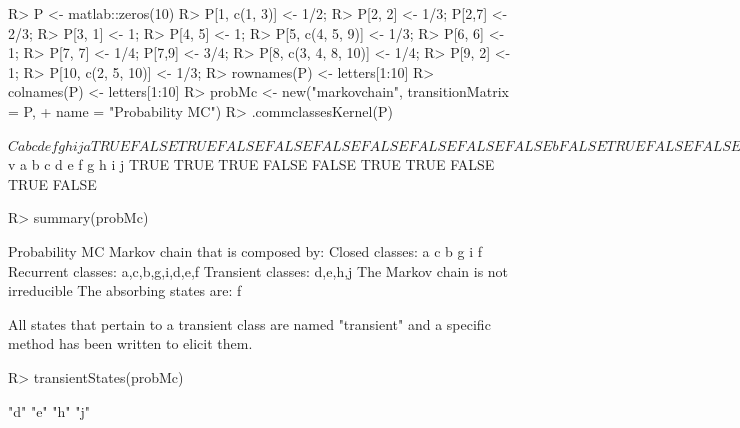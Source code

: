 \documentclass[nojss]{jss}
\begin{document}
\begin{Schunk}
\begin{Sinput}
R> P <- matlab::zeros(10)
R> P[1, c(1, 3)] <- 1/2;
R> P[2, 2] <- 1/3; P[2,7] <- 2/3;
R> P[3, 1] <- 1;
R> P[4, 5] <- 1;
R> P[5, c(4, 5, 9)] <- 1/3;
R> P[6, 6] <- 1;
R> P[7, 7] <- 1/4; P[7,9] <- 3/4;
R> P[8, c(3, 4, 8, 10)] <- 1/4;
R> P[9, 2] <- 1;
R> P[10, c(2, 5, 10)] <- 1/3;
R> rownames(P) <- letters[1:10] 
R> colnames(P) <- letters[1:10]
R> probMc <- new("markovchain", transitionMatrix = P, 
+                name = "Probability MC")
R> .commclassesKernel(P)
\end{Sinput}
\begin{Soutput}
$C
      a     b     c     d     e     f     g     h     i     j
a  TRUE FALSE  TRUE FALSE FALSE FALSE FALSE FALSE FALSE FALSE
b FALSE  TRUE FALSE FALSE FALSE FALSE  TRUE FALSE  TRUE FALSE
c  TRUE FALSE  TRUE FALSE FALSE FALSE FALSE FALSE FALSE FALSE
d FALSE FALSE FALSE  TRUE  TRUE FALSE FALSE FALSE FALSE FALSE
e FALSE FALSE FALSE  TRUE  TRUE FALSE FALSE FALSE FALSE FALSE
f FALSE FALSE FALSE FALSE FALSE  TRUE FALSE FALSE FALSE FALSE
g FALSE  TRUE FALSE FALSE FALSE FALSE  TRUE FALSE  TRUE FALSE
h FALSE FALSE FALSE FALSE FALSE FALSE FALSE  TRUE FALSE FALSE
i FALSE  TRUE FALSE FALSE FALSE FALSE  TRUE FALSE  TRUE FALSE
j FALSE FALSE FALSE FALSE FALSE FALSE FALSE FALSE FALSE  TRUE

$v
    a     b     c     d     e     f     g     h     i     j 
 TRUE  TRUE  TRUE FALSE FALSE  TRUE  TRUE FALSE  TRUE FALSE 
\end{Soutput}
\begin{Sinput}
R> summary(probMc)
\end{Sinput}
\begin{Soutput}
Probability MC  Markov chain that is composed by: 
Closed classes: 
a c 
b g i 
f 
Recurrent classes: 
{a,c},{b,g,i},{d,e},{f}
Transient classes: 
{d,e},{h},{j}
The Markov chain is not irreducible 
The absorbing states are: f
\end{Soutput}
\end{Schunk}

All states that pertain to a transient class are named "transient" and a
specific method has been written to elicit them.


\begin{Schunk}
\begin{Sinput}
R> transientStates(probMc)
\end{Sinput}
\begin{Soutput}
[1] "d" "e" "h" "j"
\end{Soutput}
\end{Schunk}
\end{document}
